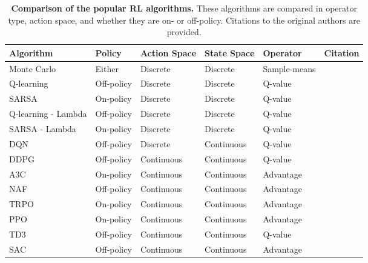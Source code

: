 \newpage\begin{table}[htp!]
    \renewcommand{\arraystretch}{1.4}
    \centering
    \captionsetup{format=hang} %
    \caption{
        \textbf{Comparison of the popular \gls{RL} algorithms.} These algorithms are compared in operator type, action space, and whether they are on- or off-policy. Citations to the original authors are provided.
    }
    \label{tab:rl:algorithms}
    \begin{tabularx}{\textwidth}{lllllX}
            \toprule
            Algorithm           & Policy       & Action Space & State Space & Operator     & Citation                     \\ 
            \midrule
            Monte Carlo         & Either       & Discrete     & Discrete    & Sample-means &                              \\
            Q-learning          & Off-policy   & Discrete     & Discrete    & Q-value      & \cite{Watkins1992}           \\
            SARSA               & On-policy    & Discrete     & Discrete    & Q-value      & \cite{Rummery1994}           \\
            Q-learning - Lambda & Off-policy   & Discrete     & Discrete    & Q-value      &                              \\
            SARSA - Lambda      & On-policy    & Discrete     & Discrete    & Q-value      &                              \\
            DQN                 & Off-policy   & Discrete     & Continuous  & Q-value      & \cite{Mnih2013, Hessel2017}  \\
            DDPG                & Off-policy   & Continuous   & Continuous  & Q-value      & \cite{Lillicrap2015}         \\
            A3C                 & On-policy    & Continuous   & Continuous  & Advantage    & \cite{Mnih2016}              \\
            NAF                 & Off-policy   & Continuous   & Continuous  & Advantage    &                              \\
            TRPO                & On-policy    & Continuous   & Continuous  & Advantage    & \cite{Schulman2015}          \\
            PPO                 & On-policy    & Continuous   & Continuous  & Advantage    & \cite{Schulman2017}          \\
            TD3                 & Off-policy   & Continuous   & Continuous  & Q-value      & \cite{Fujimoto2018}          \\
            SAC                 & Off-policy   & Continuous   & Continuous  & Advantage    & \cite{Haarnoja2018}          \\
            \bottomrule
    \end{tabularx}
\end{table}

